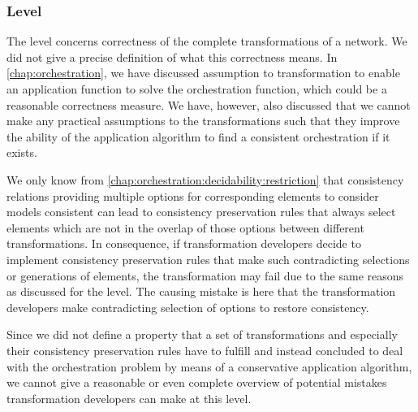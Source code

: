 \subsubsection*{\LevelNetworkRule Level}

The \levelnetworkrule level concerns correctness of the complete transformations of a network.
We did not give a precise definition of what this correctness means.
In \autoref{chap:orchestration}, we have discussed assumption to transformation to enable an application function to solve the orchestration function, which could be a reasonable correctness measure.
We have, however, also discussed that  we cannot make any practical assumptions to the transformations such that they improve the ability of the application algorithm to find a consistent orchestration if it exists.

We only know from \autoref{chap:orchestration:decidability:restriction} that consistency relations providing multiple options for corresponding elements to consider models consistent can lead to consistency preservation rules that always select elements which are not in the overlap of those options between different transformations.
In consequence, if transformation developers decide to implement consistency preservation rules that make such contradicting selections or generations of elements, the transformation may fail due to the same reasons as discussed for the \levelnetworkrelation level.
The causing mistake is here that the transformation developers make contradicting selection of options to restore consistency.

Since we did not define a property that a set of transformations and especially their consistency preservation rules have to fulfill and instead concluded to deal with the orchestration problem by means of a conservative application algorithm, we cannot give a reasonable or even complete overview of potential mistakes transformation developers can make at this level.



